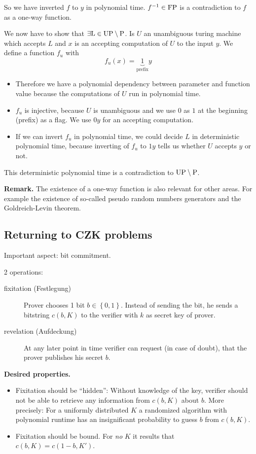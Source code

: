 \documentclass[a4paper]{article}
\newcommand{\cls}[1]{\rm{#1}}
\newcommand{\set}[1]{\left\{#1\right\}}
\begin{document}
So we have inverted $f$ to $y$ in polynomial time.
$f^{-1} \in \cls{FP}$ is a contradiction to $f$ as a one-way function.

We now have to show that $\exists \cls{L} \in \cls{UP} \setminus \cls{P}$.
Is $U$ an unambiguous turing machine which accepts $L$ and $x$ is an
accepting computation of $U$ to the input $y$. We define a function $f_u$
with
\[
  f_u(x) = \underbrace{1}_{\text{prefix}}y
\]
\begin{itemize}
  \item Therefore we have a polynomial dependency between parameter and function
        value because the computations of $U$ run in polynomial time.
  \item $f_u$ is injective, because $U$ is unambiguous and we use $0$ as $1$
        at the beginning (prefix) as a flag.
        We use $0y$ for an accepting computation.
  \item If we can invert $f_u$ in polynomial time, we could decide $L$ in
        deterministic polynomial time, because inverting of $f_u$
        to $1y$ tells us whether $U$ accepts $y$ or not.
\end{itemize}

This deterministic polynomial time is a contradiction to $\cls{UP} \setminus
\cls{P}$.

\textbf{Remark.} The existence of a one-way function is also relevant for other
areas. For example the existence of so-called pseudo random numbers generators
and the Goldreich-Levin theorem.

\subsection{Returning to CZK problems}
%
Important aspect: bit commitment.

2 operations:
\begin{description}
  \item[fixitation (Festlegung)]
    Prover chooses 1 bit $b \in \set{0,1}$. Instead of sending
    the bit, he sends a bitstring $c(b, K)$ to the verifier with $k$
    as secret key of prover.
  \item[revelation (Aufdeckung)]
    At any later point in time verifier can request (in case of doubt),
    that the prover publishes his secret $b$.
\end{description}

\textbf{Desired properties.}
\begin{itemize}
  \item
    Fixitation should be ``hidden'': Without knowledge of the key, verifier should
    not be able to retrieve any information from $c(b, K)$ about $b$.
    More precisely: For a uniformly distributed $K$ a randomized algorithm with
    polynomial runtime has an insignificant probability to guess $b$ from $c(b, K)$.
  \item
    Fixitation should be bound. For \emph{no} $K$ it results that $c(b, K) = c(1-b, K')$.
\end{itemize}
\end{document}
